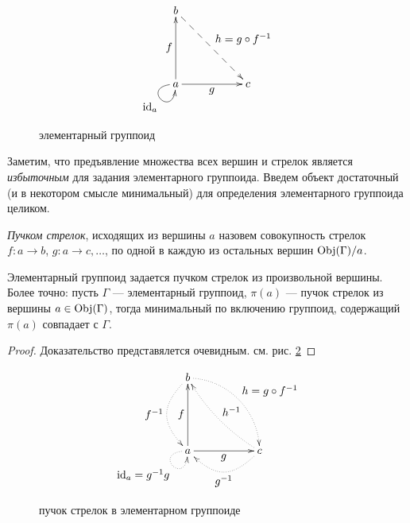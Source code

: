     \begin{figure}[h]
        \centering
        \[\xymatrix{
            b \ar@{-->}[ddrr]^{\textstyle{h=g \circ f^{-1}}} & & \\
            & & \\
            a \ar@(l,d)[]_{\textstyle{\id_a}} \ar[uu]^{\textstyle{f}} \ar[rr]_{\textstyle{g}} & & c
        }\]
        \caption{элементарный группоид}
        \label{cd_eGrup}
    \end{figure}

    Заметим, что предъявление множества всех вершин и стрелок является 
    \emph{избыточным} для задания элементарного группоида. Введем объект 
    достаточный (и в некотором смысле минимальный) для определения 
    элементарного группоида целиком.
    
    \begin{definition}
        \emph{Пучком стрелок}, исходящих из вершины $a$ назовем совокупность 
        стрелок $f: a \to b$, $g: a \to c,\ldots$, по одной в каждую из 
        остальных вершин $\operatorname*{Obj}(\Gamma)/{a}$.
    \end{definition}

    \begin{statement}
        Элементарный группоид задается пучком стрелок из произвольной вершины. 
        Более точно: пусть $\Gamma$ --- элементарный группоид, $\pi(a)$ --- 
        пучок стрелок из вершины $a \in \operatorname*{Obj}(\Gamma)$, тогда минимальный по включению 
        группоид, содержащий $\pi(a)$ совпадает с $\Gamma$.
    \end{statement}
    \begin{proof}
        Доказательство представялется очевидным. см. рис. \ref{cd_eGrup_bas}
    \end{proof}

    \begin{figure}[h]
        \centering
        \[\xymatrix{
            b \ar@{.>}@(r,u)[ddrr]^{\textstyle{h=g \circ f^{-1}}} 
              \ar@{.>}@(dl,ul)[dd]_{\textstyle{f^{-1}}} 
            & & \\
            & & \\
            a \ar@{.>}@(l,d)[]_{\textstyle{\id_a = g^{-1}g}} 
              \ar[uu]^{\textstyle{f}} \ar[rr]_{\textstyle{g}} 
            & & 
            c \ar@{.>}@(dl,dr)[ll]^{\textstyle{g^{-1}}} 
              \ar@{.>}@/^/[lluu]_{\textstyle{h^{-1}}}
        }\]
        \caption{пучок стрелок в элементарном группоиде}
        \label{cd_eGrup_bas}
    \end{figure}

